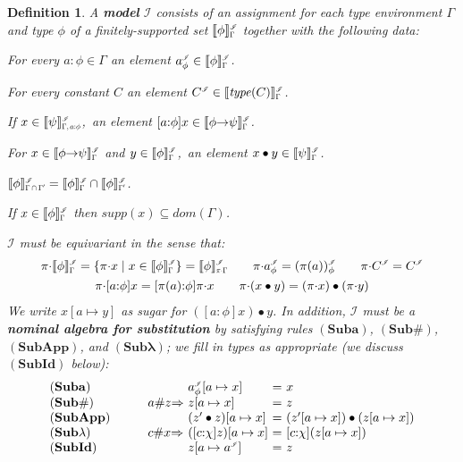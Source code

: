 \documentclass[submission,copyright]{eptcs}
\newtheorem{defn}[thrm]{Definition}
\newcommand{\deffont}[1]{\textbf{#1}}
\newcommand{\f}[1]{\ensuremath{\text{$\mathit{#1}$}}}
\newcommand{\rulefont}[1]{\ensuremath{(\mathbf{#1})}}
\newcommand{\sm}{\mapsto}
\newcommand{\dom}{\f{dom}}
\newcommand{\supp}{\f{supp}}
\newcommand\fto{{\to}}
\newcommand\limp{{\Rightarrow}}
\newcommand\den[1]{{\hspace{.00ex}\scalebox{.55}{$#1$}}}
\newcommand{\idenot}[2]{\denot{\interp I}{#1}{#2}}
\newcommand\interp[1]{\ensuremath{\mathscr #1}}
\newcommand{\denot}[3]{\llbracket #3 \rrbracket_{\scalebox{.6}{$#2$}}^\den{#1}} \newcommand{\hdenot}[1]{\denot{\interp H}{}{#1}}
\newcommand{\act}{{\cdot}}
\begin{document}
\begin{defn}
\label{defn.lambda.model}
A \deffont{model} $\interp I$ consists of an assignment for each type environment $\Gamma$ and type $\phi$ of a finitely-supported set $\idenot{\Gamma}{\phi}$ together with the following data:
\begin{enumerate*}
\item
For every $a{:}\phi\in\Gamma$ an element $a^\iden_\phi\in\idenot{\Gamma}{\phi}$.
\item
For every constant $C$ an element $C^\iden\in\idenot{\Gamma}{\f{type}(C)}$.
\item
If $x\in\idenot{\Gamma,a{:}\phi}{\psi}$,\ an element $[a{:}\phi]x\in\idenot{\Gamma}{\phi\fto\psi}$.
\item
For $x\in\idenot{\Gamma}{\phi\fto\psi}$ and $y\in\idenot{\Gamma}{\phi}$,\ an element $x\bullet y\in\idenot{\Gamma}{\psi}$.
\item
$\idenot{\Gamma\cap\Gamma'}{\phi}=\idenot{\Gamma}{\phi}\cap\idenot{\Gamma'}{\phi}$.
\item
\label{item.subset.condition}
If $x\in\idenot{\Gamma}{\phi}$ then $\supp(x)\subseteq\dom(\Gamma)$.
\end{enumerate*}
$\interp I$ must be \emph{equivariant} in the sense that:
$$
\begin{gathered}
\pi\act\idenot{\Gamma}{\phi}=\{\pi\act x\mid x\in\idenot{\Gamma}{\phi}\}=\idenot{\pi\act\Gamma}{\phi}
\qquad
\pi\act a^\iden_\phi=(\pi(a))^\iden_\phi
\qquad
\pi\act C^\iden =C^\iden
\\
\pi\act [a{:}\phi]x=[\pi(a){:}\phi]\pi\act x
\qquad
\pi\act (x\bullet y)=(\pi\act x)\bullet(\pi\act y)
\end{gathered}
$$
We write $x[a\sm y]$ as sugar for $([a{:}\phi]x)\bullet y$. 
In addition, $\interp I$ must be a \deffont{nominal algebra for substitution} by satisfying rules \rulefont{Suba}, \rulefont{Sub\#}, \rulefont{SubApp}, and \rulefont{Sub\text{$\lambda$}}; we fill in types as appropriate (we discuss \rulefont{SubId} below):
$$
\begin{array}{l@{\quad\qquad}l@{\ }l@{\ =\ }l}
\rulefont{Suba} &&a^\iden_\phi[a\sm x] & x
\\
\rulefont{Sub\#} & a\#z\limp& z[a\sm x] & z
\\
\rulefont{SubApp} & &(z'\bullet z)[a\sm x] & (z'[a\sm x])\bullet (z[a\sm x])
\\
\rulefont{Sub\text{$\lambda$}} & c\#x\limp &([c{:}\chi]z)[a\sm x] & [c{:}\chi](z[a\sm x])
\\
\rulefont{SubId} &&z[a\sm a^\iden] & z
\end{array}
$$
\end{defn}
\end{document}
